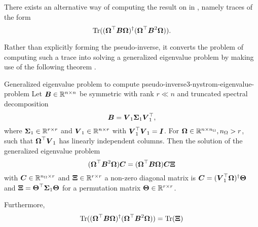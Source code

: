 There exists an alternative way of computing the result on 
in , namely traces of the form
\begin{equation}
    \operatorname{Tr}((\boldsymbol{\Omega}^{\top} \boldsymbol{B} \boldsymbol{\Omega})^{\dagger}(\boldsymbol{\Omega}^{\top} \boldsymbol{B}^2 \boldsymbol{\Omega})).
    \label{equ:3-nystrom-trace-pseudo-inverse}
\end{equation}

Rather than explicitly forming the pseudo-inverse,
it converts the problem of computing such a trace into solving a generalized
eigenvalue problem by making use of the following theorem \cite[theorem~3]{lin2017randomized}.

\begin{theorem}{Generalized eigenvalue problem to compute pseudo-inverse}{3-nystrom-eigenvalue-problem}
    Let $\boldsymbol{B} \in \mathbb{R}^{n \times n}$ be symmetric with rank $r \ll n$ and
    truncated spectral decomposition 
    \begin{equation}
        \boldsymbol{B} = \boldsymbol{V}_1 \boldsymbol{\Sigma}_1 \boldsymbol{V}_1^{\top},
        \label{equ:3-nystrom-eigenvalue-problem-spectral-decomposition}
    \end{equation}
    where $\boldsymbol{\Sigma}_1 \in \mathbb{R}^{r \times r}$ and
    $\boldsymbol{V}_1 \in \mathbb{R}^{n \times r}$ with $\boldsymbol{V}_1^{\top} \boldsymbol{V}_1 = \boldsymbol{I}$.
    For $\boldsymbol{\Omega} \in \mathbb{R}^{n \times n_{\Omega}}, n_{\Omega} > r$,
    such that $\boldsymbol{\Omega}^{\top} \boldsymbol{V}_1$ has linearly independent columns.
    Then the solution of the generalized eigenvalue problem
    \begin{equation}
        (\boldsymbol{\Omega}^{\top} \boldsymbol{B}^2 \boldsymbol{\Omega}) \boldsymbol{C} = (\boldsymbol{\Omega}^{\top} \boldsymbol{B} \boldsymbol{\Omega}) \boldsymbol{C}  \boldsymbol{\Xi}
        \label{equ:3-nystrom-low-rank-eigenvalue-problem}
    \end{equation}
    with $\boldsymbol{C} \in \mathbb{R}^{n_{\Omega} \times r}$ and $\boldsymbol{\Xi} \in \mathbb{R}^{r \times r}$ a 
    non-zero diagonal matrix is $\boldsymbol{C} = (\boldsymbol{V}_1^{\top} \boldsymbol{\Omega})^{\dagger} \boldsymbol{\Theta}$
    and $\boldsymbol{\Xi} = \boldsymbol{\Theta}^{\top} \boldsymbol{\Sigma}_1 \boldsymbol{\Theta}$
    for a permutation matrix $\boldsymbol{\Theta} \in \mathbb{R}^{r \times r}$.

    Furthermore,
    \begin{equation}
        \operatorname{Tr}((\boldsymbol{\Omega}^{\top} \boldsymbol{B} \boldsymbol{\Omega})^{\dagger}(\boldsymbol{\Omega}^{\top} \boldsymbol{B}^2 \boldsymbol{\Omega})) = \operatorname{Tr}(\boldsymbol{\Xi})
        \label{equ:3-nystrom-low-rank-trace-equalities}
    \end{equation}
\end{theorem}
